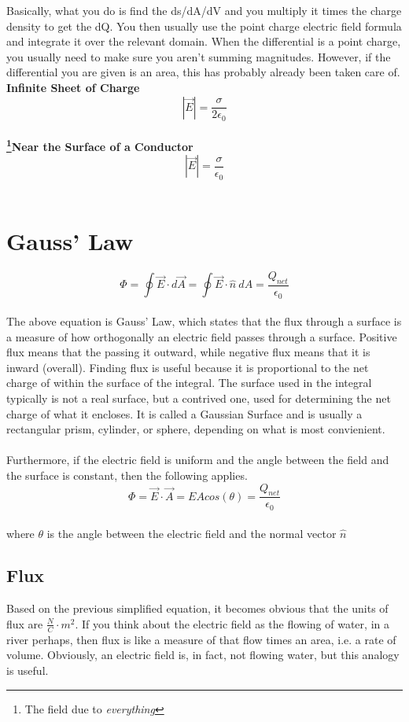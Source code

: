 \documentclass[10pt, a4paper, twocolumn]{article}
\begin{document}
            Basically, what you do is find the ds/dA/dV and you multiply it times the charge density to get the dQ. You then usually use the point charge electric field formula and integrate it over the relevant domain. When the differential is a point charge, you usually need to make sure you aren't summing magnitudes. However, if the differential you are given is an area, this has probably already been taken care of.\\

            \textbf{Infinite Sheet of Charge}
            $$|\vec{E}| = \frac{\sigma}{2\epsilon_0}$$\\

        \textbf{\footnote{The field due to \textit{everything}}{Near the Surface of a Conductor}}
            $$|\vec{E}| = \frac{\sigma}{\epsilon_0}$$\\

    \section{Gauss' Law}
    $$\Phi = \oint \vec{E} \cdot d\vec{A} = \oint \vec{E} \cdot \hat{n}\ dA = \frac{Q_{net}}{\epsilon_0}$$\\
    The above equation is Gauss' Law, which states that the flux through a surface is a measure of how orthogonally an electric field passes through a surface. Positive flux means that the passing it outward, while negative flux means that it is inward (overall). Finding flux is useful because it is proportional to the net charge of within the surface of the integral. The surface used in the integral typically is not a real surface, but a contrived one, used for determining the net charge of what it encloses. It is called a Gaussian Surface and is usually a rectangular prism, cylinder, or sphere, depending on what is most convienient.\\ \\
    Furthermore, if the electric field is uniform and the angle between the field and the surface is constant, then the following applies.\\
    $$\Phi = \vec{E} \cdot \vec{A} = EAcos(\theta) = \frac{Q_{net}}{\epsilon_0}$$\\ 
    where $\theta$ is the angle between the electric field and the normal vector $\hat{n}$\\

        \subsection{Flux}
        Based on the previous simplified equation, it becomes obvious that the units of flux are $\frac{N}{C} \cdot{m^2}$. If you think about the electric field as the flowing of water, in a river perhaps, then flux is like a measure of that flow times an area, i.e. a rate of volume. Obviously, an electric field is, in fact, not flowing water, but this analogy is useful.
\end{document}
